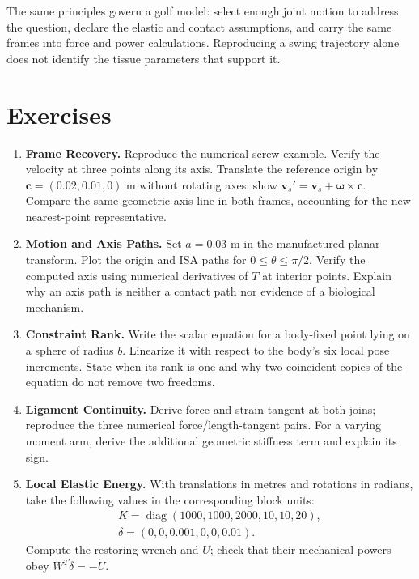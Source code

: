 The same principles govern a golf model: select enough joint motion to address
the question, declare the elastic and contact assumptions, and carry the same
frames into force and power calculations. Reproducing a swing trajectory alone
does not identify the tissue parameters that support it.

\clearpage
\section*{Exercises}
\begin{enumerate}
 \item \textbf{Frame Recovery.} Reproduce the numerical screw example. Verify
 the velocity at three points along its axis. Translate the reference origin by
 $\bm c=(0.02,0.01,0)$ m without rotating axes: show
 $\bm v_s'=\bm v_s+\bm\omega\times\bm c$. Compare the same geometric axis
 line in both frames, accounting for the new nearest-point representative.
 \item \textbf{Motion and Axis Paths.} Set $a=0.03$ m in the manufactured planar
 transform. Plot the origin and ISA paths for $0\le\theta\le\pi/2$. Verify the
 computed axis using numerical derivatives of $T$ at interior points. Explain why
 an axis path is neither a contact path nor evidence of a biological mechanism.
 \item \textbf{Constraint Rank.} Write the scalar equation for a body-fixed point
 lying on a sphere of radius $b$. Linearize it with respect to the body's six
 local pose increments. State when its rank is one and why two coincident copies
 of the equation do not remove two freedoms.
 \item \textbf{Ligament Continuity.} Derive force and strain tangent at both joins;
 reproduce the three numerical force/length-tangent pairs. For a varying moment
 arm, derive the additional geometric stiffness term and explain its sign.
 \item \textbf{Local Elastic Energy.} With translations in metres and rotations in
 radians, take the following values in the corresponding block units:
 \[
 \begin{gathered}
 K=\operatorname{diag}(1000,1000,2000,10,10,20),\\
 \delta=(0,0,0.001,0,0,0.01).
 \end{gathered}
 \]
 Compute the restoring wrench and
 $U$; check that their mechanical powers obey $W^T\dot\delta=-\dot U$.
\end{enumerate}
